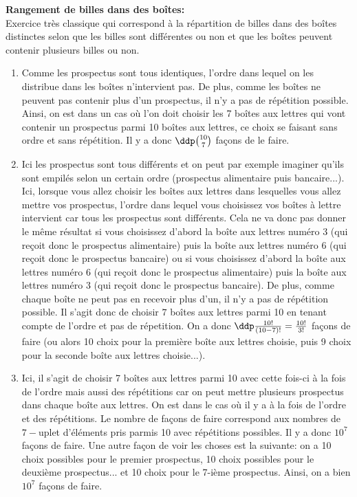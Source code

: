 \documentclass[a4paper, 11pt]{article}
\begin{document}
\begin{correction}  \; \textbf{Rangement de billes dans des bo\^ites:} \\
	\noindent Exercice tr\`es classique qui correspond \`a la r\'epartition de billes dans des bo\^ites distinctes selon que les billes sont diff\'erentes ou non et que les bo\^ites peuvent contenir plusieurs billes ou non.
	\begin{enumerate}
		\item Comme les prospectus sont tous identiques, l'ordre dans lequel on les distribue dans les bo\^ites n'intervient pas. De plus, comme les bo\^ites
		      ne peuvent pas contenir plus d'un prospectus, il n'y a pas de r\'ep\'etition possible. Ainsi, on est dans un cas o\`u l'on doit choisir les 7 bo\^ites aux lettres qui vont contenir un prospectus parmi 10 bo\^ites aux lettres, ce choix se faisant sans ordre et sans r\'ep\'etition. Il y a donc $\ddp \binom{10}{7}$ fa\c{c}ons de le faire.
		\item Ici les prospectus sont tous diff\'erents et on peut par exemple imaginer qu'ils sont empil\'es selon un certain ordre (prospectus alimentaire puis  bancaire...). Ici, lorsque vous allez choisir les bo\^ites aux lettres dans lesquelles vous allez mettre vos prospectus, l'ordre dans lequel vous choisissez vos bo\^ites \`a lettre intervient car tous les prospectus sont diff\'erents. Cela ne va donc pas donner le m\^eme r\'esultat si vous choisissez d'abord la bo\^ite aux lettres num\'ero 3 (qui re\c{c}oit donc le prospectus alimentaire) puis la bo\^ite aux lettres num\'ero 6 (qui re\c{c}oit donc le prospectus bancaire) ou si vous choisissez d'abord la bo\^ite aux lettres num\'ero 6 (qui re\c{c}oit donc le prospectus alimentaire) puis la bo\^ite aux lettres num\'ero 3 (qui re\c{c}oit donc le prospectus bancaire). De plus, comme chaque bo\^ite ne peut pas en recevoir plus d'un, il n'y a pas de r\'ep\'etition possible. Il s'agit donc de choisir $7$ bo\^ites aux lettres parmi 10 en tenant compte de l'ordre et pas de r\'epetition. On a donc $\ddp \frac{10!}{(10-7)!} = \frac{10!}{3!}$ fa\c{c}ons de faire (ou alors 10 choix pour la premi\`ere bo\^ite aux lettres choisie, puis 9 choix pour la seconde bo\^ite aux lettres choisie...).
		\item Ici, il s'agit de choisir 7 bo\^ites aux lettres parmi 10 avec cette fois-ci \`a la fois de l'ordre mais aussi des r\'ep\'etitions car on peut mettre plusieurs prospectus dans chaque bo\^ite aux lettres. On est dans le cas o\`u il y a \`a la fois de l'ordre et des r\'ep\'etitions. Le nombre de fa\c{c}ons de faire correspond aux nombres de $7-$uplet d'\'el\'ements pris parmis 10 avec r\'ep\'etitions possibles. Il y a donc $10^7$ fa\c{c}ons de faire. Une autre fa\c{c}on de voir les choses est la suivante: on a 10 choix possibles pour le premier prospectus, 10 choix possibles pour le deuxi\`eme prospectus... et 10 choix pour le 7-i\`eme prospectus. Ainsi, on a bien $10^7$ fa\c{c}ons de faire.

\end{enumerate}
\end{correction}
\end{document}
